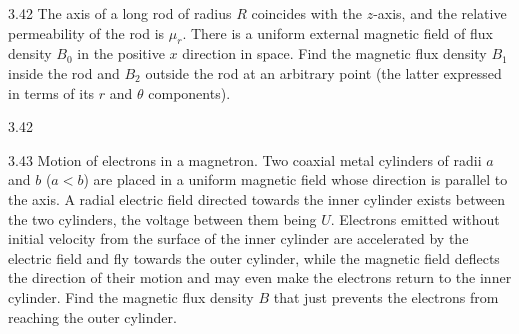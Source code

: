 \begin{problem}{3.42}
The axis of a long rod of radius $R$ coincides with the $z$-axis, and the relative permeability of the rod is $\mu_r$. There is a uniform external magnetic field of flux density $B_0$ in the positive $x$ direction in space. Find the magnetic flux density $B_1$ inside the rod and $B_2$ outside the rod at an arbitrary point (the latter expressed in terms of its $r$ and $\theta$ components).
\end{problem}

\begin{figbox}{3.42}
\end{figbox}

\begin{problem}{3.43}
Motion of electrons in a magnetron. Two coaxial metal cylinders of radii $a$ and $b$ ($a<b$) are placed in a uniform magnetic field whose direction is parallel to the axis. A radial electric field directed towards the inner cylinder exists between the two cylinders, the voltage between them being $U$. Electrons emitted without initial velocity from the surface of the inner cylinder are accelerated by the electric field and fly towards the outer cylinder, while the magnetic field deflects the direction of their motion and may even make the electrons return to the inner cylinder. Find the magnetic flux density $B$ that just prevents the electrons from reaching the outer cylinder.
\end{problem}

